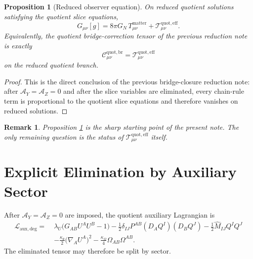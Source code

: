 \documentclass[11pt]{article}
\newcommand{\AY}{\mathcal A_Y}
\newcommand{\AZ}{\mathcal A_Z}
\newcommand{\EffAux}{\mathcal T_{\mu\nu}^{\mathrm{quot,eff}}}
\newcommand{\BridgeCorr}{\mathcal C_{\mu\nu}^{\mathrm{quot,br}}}
\newtheorem{proposition}{Proposition}
\newtheorem{remark}{Remark}
\begin{document}
\begin{proposition}[Reduced observer equation]
\label{prop:redeq}
On reduced quotient solutions satisfying the quotient slice equations,
\begin{equation}
G_{\mu\nu}[g]
=
8\pi G_N\,T_{\mu\nu}^{\mathrm{matter}}
+\EffAux.
\label{eq:redeq}
\end{equation}
Equivalently, the quotient bridge-correction tensor of the previous reduction note is exactly
\begin{equation}
\BridgeCorr=\EffAux
\label{eq:bridgeeq}
\end{equation}
on the reduced quotient branch.
\end{proposition}

\begin{proof}
This is the direct conclusion of the previous bridge-closure reduction note: after \(\AY=\AZ=0\) and after the slice variables are eliminated, every chain-rule term is proportional to the quotient slice equations and therefore vanishes on reduced solutions.
\end{proof}

\begin{remark}
Proposition \ref{prop:redeq} is the sharp starting point of the present note. The only remaining question is the status of \(\EffAux\) itself.
\end{remark}

\section{Explicit Elimination by Auxiliary Sector}

After \(\AY=\AZ=0\) are imposed, the quotient auxiliary Lagrangian is
\begin{align}
\mathcal L_{\mathrm{aux,deg}}
=\;&
\lambda_U\bigl(G_{AB}U^AU^B-1\bigr)
-\frac12\delta_{IJ}P^{AB}(D_AQ^I)(D_BQ^J)
-\frac12\widehat M_{IJ}Q^IQ^J
\nonumber\\
&-\frac{\kappa_\theta}{2}\bigl(\nabla_AU^A\bigr)^2
-\frac{\kappa_\Omega}{4}\Omega_{AB}\Omega^{AB}.
\label{eq:Ldeg}
\end{align}
The eliminated tensor may therefore be split by sector.
\end{document}
